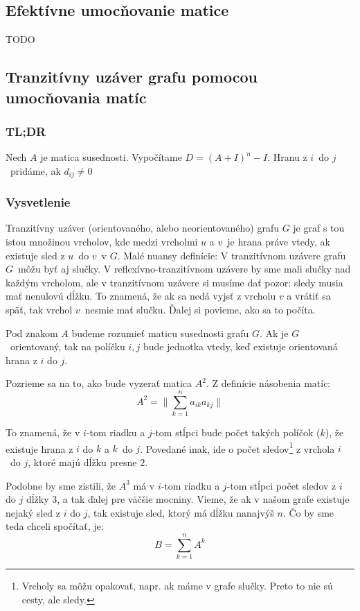 	\subsection{Efektívne umocňovanie matice} TODO
	\subsection{Tranzitívny uzáver grafu pomocou umocňovania matíc}

        \subsubsection{TL;DR}
        Nech $A$ je matica susednosti. Vypočítame $D = (A + I)^n - I$. Hranu z $i$ do $j$ pridáme,
        ak $d_{ij} \neq 0$

        \subsubsection{Vysvetlenie}
        Tranzitívny uzáver (orientovaného, alebo neorientovaného) grafu $G$ je graf s tou istou množinou vrcholov,
        kde medzi vrcholmi $u$ a $v$ je hrana práve vtedy, ak existuje sled z $u$ do $v$ v $G$. Malé nuansy definície:
        V tranzitívnom uzávere grafu $G$ môžu byť aj slučky. V reflexívno-tranzitívnom uzávere by sme mali slučky nad
        každým vrcholom, ale v tranzitívnom uzávere si musíme dať pozor: sledy musia mať nenulovú dĺžku. To znamená, že
        ak sa nedá vyjsť z vrcholu $v$ a vrátiť sa späť, tak vrchol $v$ nesmie mať slučku. Ďalej si povieme,
        ako sa to počíta.

        Pod znakom $A$ budeme rozumieť maticu susednosti grafu $G$. Ak je $G$ orientovaný, tak na políčku $i,j$ bude
        jednotka vtedy, keď existuje orientovaná hrana z $i$ do $j$.

        Pozrieme sa na to, ako bude vyzerať matica $A^2$. Z definície násobenia matíc:
        $$ A^2 = \| \sum_{k=1}^n a_{ik}a_{kj} \| $$

        To znamená, že v $i$-tom riadku a $j$-tom stĺpci bude počet takých políčok ($k$), že existuje hrana z $i$
        do $k$ a $k$ do $j$. Povedané inak, ide o počet sledov\footnote{Vrcholy sa môžu opakovať, napr. ak máme v grafe
        slučky. Preto to nie sú cesty, ale sledy.} z vrchola $i$ do $j$, ktoré majú dĺžku presne $2$.

        Podobne by sme zistili, že $A^3$ má v $i$-tom riadku a $j$-tom stĺpci počet sledov z $i$ do $j$
        dĺžky $3$, a tak ďalej pre väčšie mocniny. Vieme, že ak v našom grafe existuje nejaký sled z $i$
        do $j$, tak existuje sled, ktorý má dĺžku nanajvýš $n$. Čo by sme teda chceli spočítať, je:
        $$ B = \sum_{k=1}^{n} A^k $$

